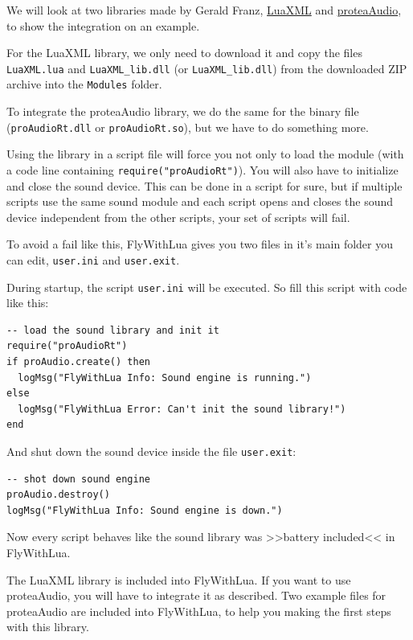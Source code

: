 \documentclass[11pt,parskip=half,a4paper]{scrartcl}
\begin{document}
We will look at two libraries made by Gerald Franz, \href{http://viremo.eludi.net/LuaXML/index.html}{LuaXML} and \href{http://viremo.eludi.net/proteaAudio/proteaaudiolua.html}{proteaAudio}, to show the integration on an example.

For the LuaXML library, we only need to download it and copy the files \verb|LuaXML.lua| and \verb|LuaXML_lib.dll| (or \verb|LuaXML_lib.dll|) from the downloaded ZIP archive into the \verb|Modules| folder.

To integrate the proteaAudio library, we do the same for the binary file (\verb|proAudioRt.dll| or \verb|proAudioRt.so|), but we have to do something more.

Using the library in a script file will force you not only to load the module (with a code line containing \verb|require("proAudioRt")|). You will also have to initialize and close the sound device. This can be done in a script for sure, but if multiple scripts use the same sound module and each script opens and closes the sound device independent from the other scripts, your set of scripts will fail.

To avoid a fail like this, FlyWithLua gives you two files in it's main folder you can edit, \verb|user.ini| and \verb|user.exit|.

During startup, the script \verb|user.ini| will be executed. So fill this script with code like this:

\begin{lstlisting}[firstnumber=1]
-- load the sound library and init it
require("proAudioRt")
if proAudio.create() then
  logMsg("FlyWithLua Info: Sound engine is running.")
else
  logMsg("FlyWithLua Error: Can't init the sound library!")
end
\end{lstlisting}

And shut down the sound device inside the file \verb|user.exit|:

\begin{lstlisting}[firstnumber=1]
-- shot down sound engine
proAudio.destroy()
logMsg("FlyWithLua Info: Sound engine is down.")
\end{lstlisting}

Now every script behaves like the sound library was >>battery included<< in FlyWithLua. 

The LuaXML library is included into FlyWithLua. If you want to use proteaAudio, you will have to integrate it as described. Two example files for proteaAudio are included into FlyWithLua, to help you making the first steps with this library.
\end{document}
